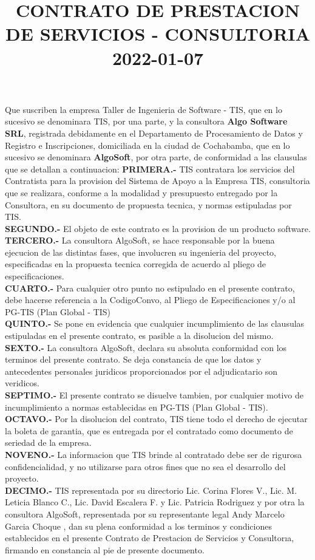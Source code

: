 \documentclass[10pt,letterpaper]{article}
\title{ \textbf{CONTRATO DE PRESTACION DE SERVICIOS - CONSULTORIA }\\2022-01-07}\date{}
\begin{document}
\maketitle


Que suscriben la empresa Taller de Ingenieria de Software - TIS, que en lo sucesivo se denominara TIS, por
una parte, y la consultora \textbf{Algo Software SRL}, registrada debidamente en el Departamento de Procesamiento de Datos y Registro e Inscripciones, domiciliada en la ciudad de Cochabamba, que en lo sucesivo se
denominara \textbf{AlgoSoft}, por otra parte, de conformidad a las clausulas que se detallan a continuacion:
\textbf{PRIMERA.-} TIS contratara los servicios del Contratista para la provision del Sistema de Apoyo a la Empresa
TIS, consultoria que se realizara, conforme a la modalidad y presupuesto entregado por la Consultora, en su
documento de propuesta tecnica, y normas estipuladas por TIS.\\
\textbf{SEGUNDO.-} El objeto de este contrato es la provision de un producto software.\\
\textbf{TERCERO.-} La consultora AlgoSoft, se hace responsable por la buena ejecucion de las distintas fases, que
involucren su ingenieria del proyecto, especificadas en la propuesta tecnica corregida de acuerdo al pliego de
especificaciones.\\
\textbf{CUARTO.-} Para cualquier otro punto no estipulado en el presente contrato, debe hacerse referencia a la
{CodigoConvo}, al Pliego de Especificaciones y/o al PG-TIS (Plan Global - TIS)\\
\textbf{QUINTO.-} Se pone en evidencia que cualquier incumplimiento de las clausulas estipuladas en el presente
contrato, es pasible a la disolucion del mismo.\\
\textbf{SEXTO.-} La consultora AlgoSoft, declara su absoluta conformidad con los terminos del presente contrato.
Se deja constancia de que los datos y antecedentes personales juridicos proporcionados por el adjudicatario son
veridicos.\\
\textbf{SEPTIMO.-} El presente contrato se disuelve tambien, por cualquier motivo de incumplimiento a normas establecidas en PG-TIS (Plan Global - TIS).\\
\textbf{OCTAVO.-} Por la disolucion del contrato, TIS tiene todo el derecho de ejecutar la boleta de garantia, que es
entregada por el contratado como documento de seriedad de la empresa.\\
\textbf{NOVENO.-} La informacion que TIS brinde al contratado debe ser de rigurosa confidencialidad, y no utilizarse
para otros fines que no sea el desarrollo del proyecto.\\
\textbf{DECIMO.-} TIS representada por su directorio Lic. Corina Flores V., Lic. M. Leticia Blanco C., Lic. David
Escalera F. y Lic. Patricia Rodriguez y por otra la consultora AlgoSoft, representada por su representante
legal Andy Marcelo Garcia Choque , dan su plena conformidad a los terminos y condiciones establecidos en el
presente Contrato de Prestacion de Servicios y Consultorıa, firmando en constancia al pie de presente documento.\\
\end{document}
